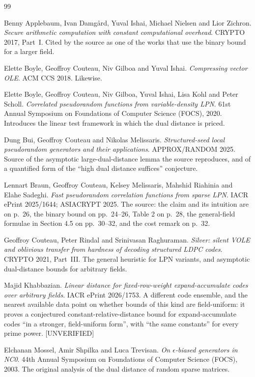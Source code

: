 \documentclass{aicr-conjecture}
\begin{document}
\begin{aicrbibliography}{99}

Benny Applebaum, Ivan Damg\aa{}rd, Yuval Ishai, Michael Nielsen and Lior
Zichron.
\emph{Secure arithmetic computation with constant computational
overhead}.
CRYPTO 2017, Part~I\@.
Cited by the source as one of the works that use the binary bound for a
larger field.

Elette Boyle, Geoffroy Couteau, Niv Gilboa and Yuval Ishai.
\emph{Compressing vector OLE}.
ACM CCS 2018.
Likewise.

Elette Boyle, Geoffroy Couteau, Niv Gilboa, Yuval Ishai, Lisa Kohl and
Peter Scholl.
\emph{Correlated pseudorandom functions from variable-density LPN}.
61st Annual Symposium on Foundations of Computer Science (FOCS), 2020.
Introduces the linear test framework in which the dual distance is
priced.

Dung Bui, Geoffroy Couteau and Nikolas Melissaris.
\emph{Structured-seed local pseudorandom generators and their
applications}.
APPROX/RANDOM 2025.
Source of the asymptotic large-dual-distance lemma the source
reproduces, and of a quantified form of the ``high dual distance
suffices'' conjecture.

Lennart Braun, Geoffroy Couteau, Kelsey Melissaris, Mahshid Riahinia and
Elahe Sadeghi.
\emph{Fast pseudorandom correlation functions from sparse LPN}.
IACR ePrint 2025/1644; ASIACRYPT 2025.
The source: the claim and its intuition are on p.\ 26, the binary bound
on pp.\ 24--26, Table 2 on p.\ 28, the general-field formulae in
Section 4.5 on pp.\ 30--32, and the cost remark on p.\ 32.

Geoffroy Couteau, Peter Rindal and Srinivasan Raghuraman.
\emph{Silver: silent VOLE and oblivious transfer from hardness of
decoding structured LDPC codes}.
CRYPTO 2021, Part~III\@.
The general heuristic for LPN variants, and asymptotic dual-distance
bounds for arbitrary fields.

Majid Khabbazian.
\emph{Linear distance for fixed-row-weight expand-accumulate codes over
arbitrary fields}.
IACR ePrint 2026/1753.
A different code ensemble, and the nearest available data point on
whether bounds of this kind are field-uniform: it proves a conjectured
constant-relative-distance bound for expand-accumulate codes ``in a
stronger, field-uniform form'', with ``the same constants'' for every
prime power.
[UNVERIFIED]

Elchanan Mossel, Amir Shpilka and Luca Trevisan.
\emph{On $\epsilon$-biased generators in NC0}.
44th Annual Symposium on Foundations of Computer Science (FOCS), 2003.
The original analysis of the dual distance of random sparse matrices.

\end{aicrbibliography}
\end{document}

